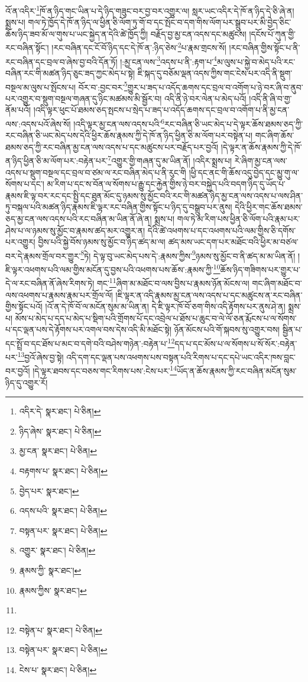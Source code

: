 འོ་ན་འདིར་\footnote{འདིར་དེ་  སྣར་ཐང་།  པེ་ཅིན། }ཁོ་ན་ཉིད་གང་ཡིན་པ་དེ་ཉིད་གཟུང་བར་བྱ་བར་འགྱུར་ལ། སླར་ཡང་འདིར་དེ་ཁོ་ན་ཉིད་དེ་ཅི་ཞེ་ན། སྨྲས་པ། གལ་ཏེ་ཁྱོད་དེ་ཁོ་ན་ཉིད་ལ་ཕྱིན་ཅི་ལོག་ཏུ་གོ་བ་དང་སྤོང་བ་དག་གིས་ལོག་པར་སྒྲུབ་པར་མི་བྱེད་ཅིང་ཆོས་ཉིད་ཟབ་མོ་ལ་གུས་པ་ཡང་སྐྱེད་ན་དེའི་ཚེ་ཁྱོད་ཀྱི། བརྗོད་བྱ་མྱ་ངན་འདས་དང་མཚུངས། །དངོས་པོ་ཀུན་གྱི་རང་བཞིན་སྟོང་། །རང་བཞིན་དང་ངོ་བོ་ཉིད་དང་དེ་ཁོ་ན་:ཉིད་ཅེས་\footnote{ཉིད་ཞེས་  སྣར་ཐང་།  པེ་ཅིན། }པ་རྣམ་གྲངས་སོ། །རང་བཞིན་གྱིས་སྟོང་པ་ནི་རང་བཞིན་དང་བྲལ་བ་ཞེས་བྱ་བའི་དོན་ཏོ། །:མྱ་ངན་ལས་\footnote{མྱ་ངན་  སྣར་ཐང་།  པེ་ཅིན། }འདས་པ་ནི་:རྟག་པ་\footnote{བརྟགས་པ་  སྣར་ཐང་།  པེ་ཅིན། }མ་ལུས་པ་སྐྱེ་བ་མེད་པའི་རང་བཞིན་རང་གི་མཚན་ཉིད་ཅུང་ཟད་ཀྱང་མེད་པ་སྟེ། ཇི་སྐད་དུ་བཅོམ་ལྡན་འདས་ཀྱིས་གང་ངེས་པར་འདི་ནི་སྡུག་བསྔལ་མ་ལུས་པ་སྤོངས་པ། བོར་བ་:བྱང་བར་\footnote{བྱེད་པར་  སྣར་ཐང་། }གྱུར་པ་ཟད་པ་འདོད་ཆགས་དང་བྲལ་བ་འགོག་པ་ཉེ་བར་ཞི་བ་ནུབ་པར་འགྱུར་བ་སྡུག་བསྔལ་གཞན་དུ་ཉིང་མཚམས་མི་སྦྱོར་བ། འདི་ནི་ཉེ་བར་ལེན་པ་མེད་པའོ། །འདི་ནི་ཞི་བ་གྱ་ནོམ་པའོ། །འདི་ལྟར་ཕུང་པོ་ཐམས་ཅད་སྤངས་པ་སྲེད་པ་ཟད་པ་འདོད་ཆགས་དང་བྲལ་བ་འགོག་པ་ནི་མྱ་ངན་ལས་:འདས་པའོ་ཞེས་སོ། །འདི་ལྟར་མྱ་ངན་ལས་འདས་པའི་\footnote{འདས་པའི་  སྣར་ཐང་།  པེ་ཅིན། }རང་བཞིན་ཅི་ཡང་མེད་པ་དེ་ལྟར་ཆོས་ཐམས་ཅད་ཀྱི་རང་བཞིན་ཅི་ཡང་མེད་པས་དེའི་ཕྱིར་ཆོས་རྣམས་ཀྱི་དེ་ཁོ་ན་ཉིད་ཕྱིན་ཅི་མ་ལོག་པར་བསྟེན་པ། གང་ཞིག་ཆོས་ཐམས་ཅད་ཀྱི་རང་བཞིན་མྱ་ངན་ལས་འདས་པ་དང་མཚུངས་པར་བརྗོད་པར་བྱའོ། །དེ་ལྟར་ན་ཆོས་རྣམས་ཀྱི་དེ་ཁོ་ན་ཉིད་ཕྱིན་ཅི་མ་ལོག་པར་:བརྟེན་པར་\footnote{བསྟན་པར་  སྣར་ཐང་།  པེ་ཅིན། }འགྱུར་གྱི་གཞན་དུ་མ་ཡིན་ནོ། །འདིར་སྨྲས་པ། རེ་ཞིག་མྱ་ངན་ལས་འདས་པ་སྡུག་བསྔལ་དང་བྲལ་བ་ཙམ་ལ་རང་བཞིན་མེད་པ་ནི་རུང་གི །ཕྱི་དང་ནང་གི་ཆོས་འདུ་བྱེད་དང་མྱུ་གུ་ལ་སོགས་པ་དང་། མ་རིག་པ་དང་ས་བོན་ལ་སོགས་པ་རྒྱུ་དང་རྐྱེན་གྱིས་ཉེ་བར་བསྐྱེད་པའི་བདག་ཉིད་དུ་ཡོད་པ་རྣམས་ཇི་ལྟ་བར་རང་དང་སྤྱི་དང་ཐུན་མོང་དུ་ཉམས་སུ་མྱོང་བའི་རང་གི་མཚན་ཉིད་མྱ་ངན་ལས་འདས་པ་ལས་ཤིན་ཏུ་བསྐལ་པའི་མཚན་ཉིད་རྣམས་ཇི་ལྟར་རང་བཞིན་གྱིས་སྟོང་པ་ཉིད་དུ་བསྒྲུབ་པར་ནུས། དེའི་ཕྱིར་གང་ཆོས་ཐམས་ཅད་མྱ་ངན་ལས་འདས་པའི་རང་བཞིན་མ་ཡིན་ནོ་ཞེ་ན། སྨྲས་པ། གལ་ཏེ་མ་རིག་པས་ཕྱིན་ཅི་ལོག་པའི་རྣམ་པར་ཤེས་པ་ལ་ཉམས་སུ་མྱོང་བ་རྣམས་ཚད་མར་འགྱུར་ན། དེའི་ཚེ་འཕགས་པ་དང་འཕགས་པའི་ལམ་གྱིས་ཅི་དགོས་པར་འགྱུར། བྱིས་པའི་སྐྱེ་བོས་ཉམས་སུ་མྱོང་བ་ཉིད་ཚད་མ་ལ། ཚད་མས་ཡང་དག་པར་མཐོང་བའི་ཕྱིར་མ་བཙལ་བར་དེ་རྣམས་གྲོལ་བར་གྱུར་\footnote{འགྱུར་  སྣར་ཐང་།  པེ་ཅིན། }ཏེ། དེ་ལྟ་བུ་ཡང་མེད་པས་དེ་:རྣམས་ཀྱིས་\footnote{རྣམས་ཀྱི་  སྣར་ཐང་། }ཉམས་སུ་མྱོང་བ་ནི་ཚད་མ་མ་ཡིན་ནོ། །ཇི་ལྟར་འཕགས་པའི་ལམ་གྱིས་མངོན་དུ་བྱས་པའི་འཕགས་པས་ཆོས་:རྣམས་ཀྱི་\footnote{རྣམས་ཀྱིས་  སྣར་ཐང་། }ཆོས་ཉིད་གཟིགས་པར་གྱུར་པ་དེ་ལ་རང་བཞིན་ནོ་ཞེས་རིགས་ཏེ། གང་\footnote{}ཞིག་མ་མཐོང་བ་ལས་བྱིས་པ་རྣམས་ཉོན་མོངས་ལ། གང་ཞིག་མཐོང་བ་ལས་འཕགས་པ་རྣམས་རྣམ་པར་གྲོལ་ལོ། །ཇི་ལྟར་ན་འདི་རྣམས་མྱ་ངན་ལས་འདས་པ་དང་མཚུངས་ན་རང་བཞིན་གྱིས་སྟོང་པའོ། །འོ་ན་དེ་ཁོ་བོ་ལ་མངོན་སུམ་མ་ཡིན་ན། དེ་ཇི་ལྟར་ཁོ་བོ་ཅག་གིས་འདི་རྟོགས་པར་ནུས་ཤེ་ན། སྨྲས་པ། མོས་པ་མེད་པ་དད་པ་མེད་པ་སྡིག་པའི་གྲོགས་པོ་དང་འབྲེལ་པ་ཐོས་པ་ཆུང་བ་ལེ་ལོ་ཅན་རྨོངས་པ་ལ་སོགས་པ་དང་ལྡན་པས་དེ་རྟོགས་པར་འགལ་བས་དེས་འདི་མི་མཐོང་སྟེ། ཉོན་མོངས་པའི་གོ་སྐབས་སུ་འགྱུར་བས། སྦྱིན་པ་དང་སྤྲོ་བ་དང་ཐོས་པ་མང་བ་དགེ་བའི་བཤེས་གཉེན་:བརྟེན་པ་\footnote{བསྟེན་པ་  སྣར་ཐང་།  པེ་ཅིན། }དད་པ་དང་མོས་པ་ལ་སོགས་པ་སོ་སོར་:བརྟེན་པར་\footnote{བསྟེན་པར་  སྣར་ཐང་།  པེ་ཅིན། }བྱའོ་ཞེས་བྱ་སྟེ། འདི་དག་དང་ལྡན་པས་འཕགས་པས་བསྟན་པའི་རིགས་པ་དང་དཔེ་ཡང་འདིར་ཁས་བླང་བར་བྱའོ། །དེ་ལྟར་ཐབས་དང་བཅས་གང་རིགས་པས་:ངེས་པར་\footnote{ངེས་པ་  སྣར་ཐང་།  པེ་ཅིན། }ཡོད་ན་ཆོས་རྣམས་ཀྱི་རང་བཞིན་མངོན་སུམ་ཉིད་དུ་འགྱུར་རོ། 